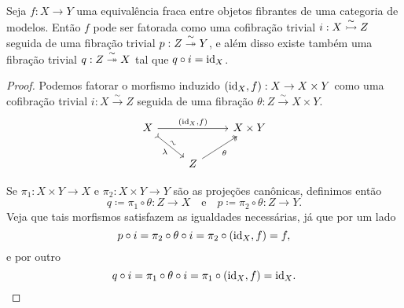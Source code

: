 \begin{prop}
  \label{prop:lema_de_fatoracao}
  Seja $f: X \to Y$ uma equivalência fraca entre objetos fibrantes de uma categoria de modelos.
  Então $f$ pode ser fatorada como uma cofibração trivial $i: X \overset{\sim}{\rightarrowtail} Z$ seguida de uma fibração trivial $p: Z \overset{\sim}{\twoheadrightarrow} Y$, e além disso existe também uma fibração trivial $q: Z \overset{\sim}{\twoheadrightarrow} X$ tal que $q \circ i = \mathrm{id}_{X}$.
\end{prop}

\begin{proof}
  Podemos fatorar o morfismo induzido $(\mathrm{id}_{X},f): X \to X \times Y$ como uma cofibração trivial $i: X \overset{\sim}{\to} Z$ seguida de uma fibração $\theta: Z \overset{\sim}{\to} X \times Y$.
  \begin{displaymath}
    \begin{tikzcd}
      X
      \arrow[rr, "{(\id_{X},f)}"]
      \arrow[rd, tail, "\sim" {sloped}, "\lambda" {swap}]
      & & X \times Y
      \\ & Z
      \arrow[ru, two heads, "\theta" swap]
    \end{tikzcd}
  \end{displaymath}

  Se $\pi_{1}: X \times Y \to X$ e $\pi_{2}: X \times Y \to Y$ são as projeções canônicas, definimos então
  \begin{displaymath}
    q \coloneqq \pi_{1} \circ \theta: Z \to X \quad \text{e} \quad p \coloneqq \pi_{2} \circ \theta: Z \to Y.
  \end{displaymath}
  Veja que tais morfismos satisfazem as igualdades necessárias, já que por um lado
  \begin{displaymath}
    p \circ i = \pi_{2} \circ \theta \circ i = \pi_{2} \circ (\mathrm{id}_{X},f) = f,
  \end{displaymath}
  e por outro
  \begin{displaymath}
    q \circ i = \pi_{1} \circ \theta \circ i = \pi_{1} \circ (\mathrm{id}_{X},f) = \mathrm{id}_{X}.
  \end{displaymath}


\end{proof}
